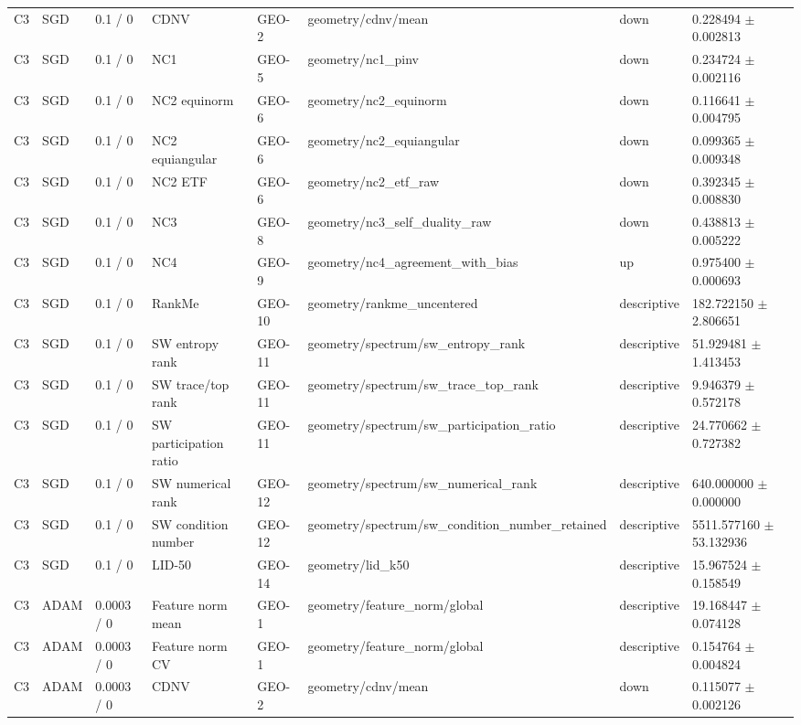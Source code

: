 \begin{longtable}{llllllll}
C3 & SGD & 0.1 / 0 & CDNV & GEO-2 & geometry/cdnv/mean & down & 0.228494 $\pm$ 0.002813 \\
C3 & SGD & 0.1 / 0 & NC1 & GEO-5 & geometry/nc1\_pinv & down & 0.234724 $\pm$ 0.002116 \\
C3 & SGD & 0.1 / 0 & NC2 equinorm & GEO-6 & geometry/nc2\_equinorm & down & 0.116641 $\pm$ 0.004795 \\
C3 & SGD & 0.1 / 0 & NC2 equiangular & GEO-6 & geometry/nc2\_equiangular & down & 0.099365 $\pm$ 0.009348 \\
C3 & SGD & 0.1 / 0 & NC2 ETF & GEO-6 & geometry/nc2\_etf\_raw & down & 0.392345 $\pm$ 0.008830 \\
C3 & SGD & 0.1 / 0 & NC3 & GEO-8 & geometry/nc3\_self\_duality\_raw & down & 0.438813 $\pm$ 0.005222 \\
C3 & SGD & 0.1 / 0 & NC4 & GEO-9 & geometry/nc4\_agreement\_with\_bias & up & 0.975400 $\pm$ 0.000693 \\
C3 & SGD & 0.1 / 0 & RankMe & GEO-10 & geometry/rankme\_uncentered & descriptive & 182.722150 $\pm$ 2.806651 \\
C3 & SGD & 0.1 / 0 & SW entropy rank & GEO-11 & geometry/spectrum/sw\_entropy\_rank & descriptive & 51.929481 $\pm$ 1.413453 \\
C3 & SGD & 0.1 / 0 & SW trace/top rank & GEO-11 & geometry/spectrum/sw\_trace\_top\_rank & descriptive & 9.946379 $\pm$ 0.572178 \\
C3 & SGD & 0.1 / 0 & SW participation ratio & GEO-11 & geometry/spectrum/sw\_participation\_ratio & descriptive & 24.770662 $\pm$ 0.727382 \\
C3 & SGD & 0.1 / 0 & SW numerical rank & GEO-12 & geometry/spectrum/sw\_numerical\_rank & descriptive & 640.000000 $\pm$ 0.000000 \\
C3 & SGD & 0.1 / 0 & SW condition number & GEO-12 & geometry/spectrum/sw\_condition\_number\_retained & descriptive & 5511.577160 $\pm$ 53.132936 \\
C3 & SGD & 0.1 / 0 & LID-50 & GEO-14 & geometry/lid\_k50 & descriptive & 15.967524 $\pm$ 0.158549 \\
C3 & ADAM & 0.0003 / 0 & Feature norm mean & GEO-1 & geometry/feature\_norm/global & descriptive & 19.168447 $\pm$ 0.074128 \\
C3 & ADAM & 0.0003 / 0 & Feature norm CV & GEO-1 & geometry/feature\_norm/global & descriptive & 0.154764 $\pm$ 0.004824 \\
C3 & ADAM & 0.0003 / 0 & CDNV & GEO-2 & geometry/cdnv/mean & down & 0.115077 $\pm$ 0.002126 \\

\end{longtable}
